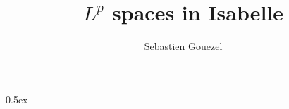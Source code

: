 \documentclass[11pt,a4paper]{article}
\begin{document}
\title{$L^p$ spaces in Isabelle}
\author{Sebastien Gouezel}
\date{}
\maketitle

\tableofcontents

\parindent 0pt\parskip 0.5ex



%
%
\end{document}

